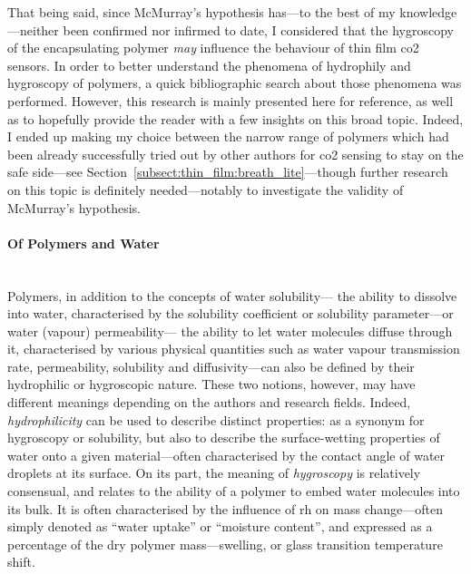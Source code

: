 That being said, since McMurray's hypothesis has---to the best of my knowledge---neither been confirmed nor infirmed to date, I considered that the hygroscopy of the encapsulating polymer \emph{may} influence the behaviour of thin film \gls{co2} sensors. In order to better understand the phenomena of hydrophily and hygroscopy of polymers, a quick bibliographic search about those phenomena was performed. However, this research is mainly presented here for reference, as well as to hopefully provide the reader with a few insights on this broad topic. Indeed, I ended up making my choice between the narrow range of polymers which had been already successfully tried out by other authors for \gls{co2} sensing to stay on the safe side---see Section~\ref{subsect:thin_film:breath_lite}---though \mfrin{}further research on this topic is definitely needed---notably to investigate the validity of McMurray's hypothesis.

\paragraph{Of Polymers and Water}\mbox{}\\

Polymers, in addition to the concepts of water solubility---\ie{} the ability to dissolve into water, characterised by the solubility coefficient or solubility parameter\cite{gong2007}---or water (vapour) permeability---\ie{} the ability to let water molecules diffuse through it, characterised by various physical quantities such as water vapour transmission rate, permeability, solubility and diffusivity\cite{chapter4_solubility}---can also be defined by their hydrophilic or hygroscopic nature. These two notions, however, may have different meanings depending on the authors and research fields. Indeed, \emph{hydrophilicity} can be used to describe distinct properties: as a synonym for hygroscopy or solubility, but also to describe the surface-wetting properties of water onto a given material---often characterised by the contact angle of water droplets at its surface\cite{drelich2011, corsaro2021}. On its part, the meaning of \emph{hygroscopy} is relatively consensual, and relates to the ability of a polymer to embed water molecules into its bulk. It is often characterised by the influence of \gls{rh} on mass change---often simply denoted as \enquote{water uptake} or \enquote{moisture content}, and expressed as a percentage of the dry polymer mass\cite{valenzuela2011, vidovic2013}---swelling\cite{grossutti2020}, or glass transition temperature shift\cite{patel2022_part1, patel2022_part2, patel2023_part3}.

